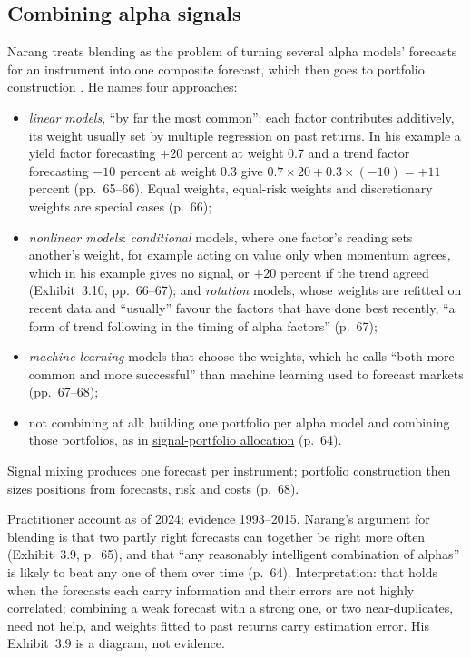 \subsection{Combining alpha signals}

\begin{qfmethod}\label{meth:alpha-signal-combination}
 Narang treats blending as the problem of turning several alpha models' forecasts for an instrument into one composite forecast, which then goes to portfolio construction \citep[chap.~3, ``Alpha Models: How Quants Make Money'', sec.~3.5, pp.~64--68]{s7-narang}. He names four approaches:
\begin{itemize}
\item \emph{linear models}, ``by far the most common'': each factor contributes additively, its weight usually set by multiple regression on past returns. In his example a yield factor forecasting $+20$ percent at weight 0.7 and a trend factor forecasting $-10$ percent at weight 0.3 give $0.7\times20+0.3\times(-10)=+11$ percent (pp.~65--66). Equal weights, equal-risk weights and discretionary weights are special cases (p.~66);
\item \emph{nonlinear models}: \emph{conditional} models, where one factor's reading sets another's weight, for example acting on value only when momentum agrees, which in his example gives no signal, or $+20$ percent if the trend agreed (Exhibit~3.10, pp.~66--67); and \emph{rotation} models, whose weights are refitted on recent data and ``usually'' favour the factors that have done best recently, ``a form of trend following in the timing of alpha factors'' (p.~67);
\item \emph{machine-learning} models that choose the weights, which he calls ``both more common and more successful'' than machine learning used to forecast markets (pp.~67--68);
\item not combining at all: building one portfolio per alpha model and combining those portfolios, as in \hyperref[meth:signal-portfolio-allocation]{signal-portfolio allocation} (p.~64).
\end{itemize}
Signal mixing produces one forecast per instrument; portfolio construction then sizes positions from forecasts, risk and costs (p.~68).

 Practitioner account as of 2024; evidence 1993--2015. Narang's argument for blending is that two partly right forecasts can together be right more often (Exhibit~3.9, p.~65), and that ``any reasonably intelligent combination of alphas'' is likely to beat any one of them over time (p.~64). Interpretation: that holds when the forecasts each carry information and their errors are not highly correlated; combining a weak forecast with a strong one, or two near-duplicates, need not help, and weights fitted to past returns carry estimation error. His Exhibit~3.9 is a diagram, not evidence.


\end{qfmethod}
